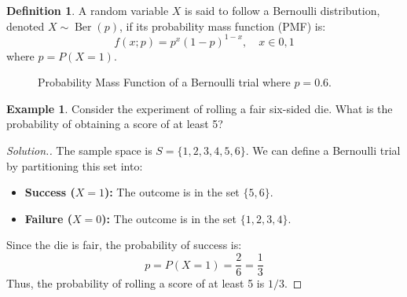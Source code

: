 \documentclass[12pt,a4paper]{report}
\theoremstyle{definition}
\newtheorem{definition}[thm]{Definition}
\newtheorem{example}[thm]{Example}
\theoremstyle{plain}
\theoremstyle{definition}
\newenvironment{solution}
  {\renewcommand{\qedsymbol}{}\begin{proof}[\textit{Solution}.]}
  {\end{proof}}
\begin{document}
\begin{definition}
A random variable $X$ is said to follow a Bernoulli distribution, denoted $X \sim \operatorname{Ber}(p)$, if its probability mass function (PMF) is:\[ f(x; p) = p^x(1-p)^{1-x}, \quad x \in {0, 1} \]where $p = P(X=1)$.
\end{definition}



\begin{figure}[H]
    \centering
    \caption{Probability Mass Function of a Bernoulli trial where $p=0.6$.}
\end{figure}




\begin{example}
Consider the experiment of rolling a fair six-sided die. What is the probability of obtaining a score of at least 5?
\end{example}

\begin{solution}
The sample space is $S = \{1, 2, 3, 4, 5, 6\}$. We can define a Bernoulli trial by partitioning this set into:
\begin{itemize}
\item \textbf{Success ($X=1$):} The outcome is in the set $\{5, 6\}$.
\item \textbf{Failure ($X=0$):} The outcome is in the set $\{1, 2, 3, 4\}$.
\end{itemize}
Since the die is fair, the probability of success is:\[ p = P(X=1) = \frac{2}{6} = \frac{1}{3} \]Thus, the probability of rolling a score of at least 5 is $1/3$.
\end{solution}
\end{document}
